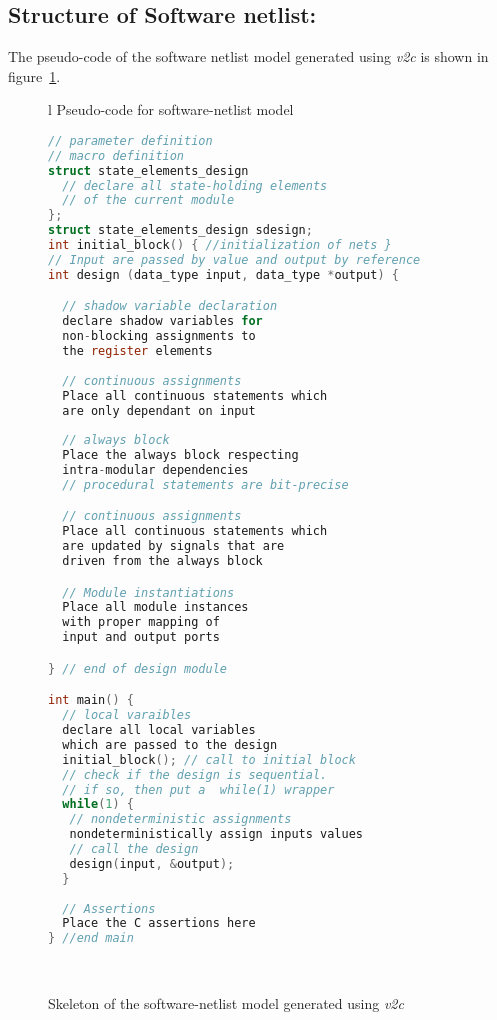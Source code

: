 \subsection{Structure of Software netlist:} The pseudo-code of the software 
netlist model generated using \emph{v2c} is shown in figure~\ref{figure:structure}.
%
\begin{figure}[t]
\captionsetup{justification=justified}
\scriptsize
\begin{tabular}{l}
\hline
 Pseudo-code for software-netlist model \\
\hline
\begin{lstlisting}[mathescape=true,language=C]
// parameter definition
// macro definition
struct state_elements_design
  // declare all state-holding elements
  // of the current module 
};
struct state_elements_design sdesign;
int initial_block() { //initialization of nets }
// Input are passed by value and output by reference
int design (data_type input, data_type *output) {

  // shadow variable declaration
  declare shadow variables for 
  non-blocking assignments to 
  the register elements  
  
  // continuous assignments
  Place all continuous statements which 
  are only dependant on input
 
  // always block 
  Place the always block respecting
  intra-modular dependencies
  // procedural statements are bit-precise

  // continuous assignments
  Place all continuous statements which 
  are updated by signals that are 
  driven from the always block

  // Module instantiations 
  Place all module instances 
  with proper mapping of 
  input and output ports

} // end of design module

int main() {
  // local varaibles 
  declare all local variables 
  which are passed to the design 
  initial_block(); // call to initial block
  // check if the design is sequential.
  // if so, then put a  while(1) wrapper
  while(1) {
   // nondeterministic assignments
   nondeterministically assign inputs values  
   // call the design
   design(input, &output);
  }
 
  // Assertions 
  Place the C assertions here 
} //end main 
\end{lstlisting}
\\
\hline
\end{tabular}
\caption{Skeleton of the software-netlist model generated using \emph{v2c}}
\label{figure:structure}
\end{figure}
